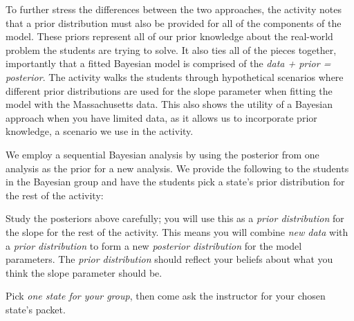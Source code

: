 \documentclass[
  12pt,
  letterpaper,
  DIV=11,
  numbers=noendperiod]{scrartcl}
\begin{document}
To further stress the differences between the two approaches, the
activity notes that a prior distribution must also be provided for all
of the components of the model. These priors represent all of our prior
knowledge about the real-world problem the students are trying to solve.
It also ties all of the pieces together, importantly that a fitted
Bayesian model is comprised of the \emph{data + prior = posterior}. The
activity walks the students through hypothetical scenarios where
different prior distributions are used for the slope parameter when
fitting the model with the Massachusetts data. This also shows the
utility of a Bayesian approach when you have limited data, as it allows
us to incorporate prior knowledge, a scenario we use in the activity.

We employ a sequential Bayesian analysis by using the posterior from one
analysis as the prior for a new analysis. We provide the following to
the students in the Bayesian group and have the students pick a state's
prior distribution for the rest of the activity:

\begin{tcolorbox}[enhanced jigsaw, arc=.35mm, coltitle=black, leftrule=.75mm, bottomtitle=1mm, colback=white, rightrule=.15mm, colframe=quarto-callout-note-color-frame, toprule=.15mm, left=2mm, opacitybacktitle=0.6, toptitle=1mm, title={Pick a State}, colbacktitle=quarto-callout-note-color!10!white, breakable, titlerule=0mm, opacityback=0, bottomrule=.15mm]

Study the posteriors above carefully; you will use this as a \emph{prior
distribution} for the slope for the rest of the activity. This means you
will combine \emph{new data} with a \emph{prior distribution} to form a
new \emph{posterior distribution} for the model parameters. The
\emph{prior distribution} should reflect your beliefs about what you
think the slope parameter should be.

Pick \emph{one state for your group}, then come ask the instructor for
your chosen state's packet.

\end{tcolorbox}
\end{document}
